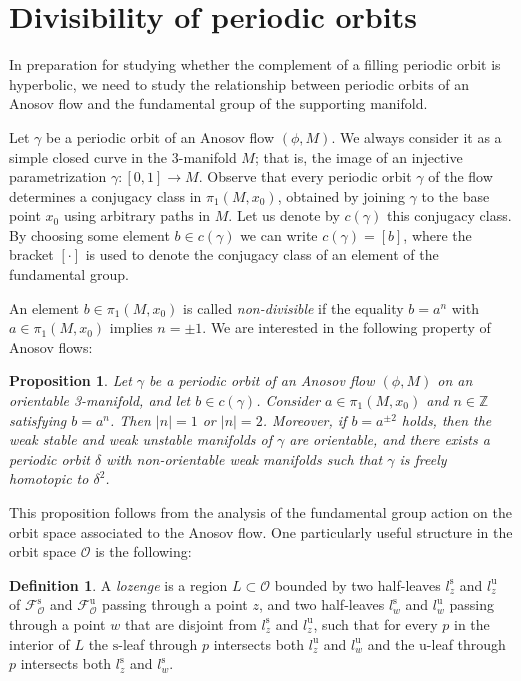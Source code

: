 \documentclass[12pt]{amsart}
\newtheorem{proposition}[theorem]{Proposition}
\theoremstyle{definition}
\newtheorem{definition}[theorem]{Definition}
\theoremstyle{remark}
\renewcommand{\O}{\mathcal{O}}
\newcommand{\Z}{\mathbb{Z}}
\newcommand{\Fs}{\mathcal{F}^{\mathrm{s}}_\mathcal{O}}
\newcommand{\Fu}{\mathcal{F}^{\mathrm{u}}_\mathcal{O}}
\begin{document}
\section{Divisibility of periodic orbits}
\label{sec:divisibility}


In preparation for studying whether the complement of a filling periodic orbit is hyperbolic, we need to study the relationship between periodic orbits of an Anosov flow and the fundamental group of the supporting manifold. 


Let $\gamma$ be a periodic orbit of an Anosov flow $(\phi,M)$. We always consider it as a simple closed curve in the 3-manifold $M$; that is, the image of an injective parametrization $\gamma:[0,1]\to M$. Observe that every periodic orbit $\gamma$ of the flow determines a conjugacy class in $\pi_1(M,x_0)$, obtained by joining $\gamma$ to the base point $x_0$ using arbitrary paths in $M$. Let us denote by $c(\gamma)$ this conjugacy class. By choosing some element $b\in c(\gamma)$ we can write $c(\gamma)=[b]$, where the bracket $[\cdot]$ is used to denote the conjugacy class of an element of the fundamental group. 


An element $b\in\pi_1(M,x_0)$ is called \emph{non-divisible} if the equality $b=a^n$ with $a\in\pi_1(M,x_0)$ implies $n=\pm 1$. We are interested in the following property of Anosov flows:


\begin{proposition}\label{prop_divisibility_per_orbits}
    Let $\gamma$ be a periodic orbit of an Anosov flow $(\phi,M)$ on an orientable 3-manifold, and let $b\in c(\gamma)$. Consider $a\in\pi_1(M,x_0)$ and $n\in\Z$ satisfying $b=a^n$. Then $|n|=1$ or $|n|=2$. Moreover, if $b=a^{\pm 2}$ holds, then the weak stable and weak unstable manifolds of $\gamma$ are orientable, and there exists a periodic orbit $\delta$ with non-orientable weak manifolds such that $\gamma$ is freely homotopic to $\delta^2$.
\end{proposition}


This proposition follows from the analysis of the fundamental group action on the orbit space associated to the Anosov flow. One particularly useful structure in the orbit space $\O$ is the following:


\begin{definition}
A \emph{lozenge} is a region $L\subset\O$ bounded by two half-leaves $l^\mathrm{s}_z$ and $l^\mathrm{u}_z$ of $\Fs$ and $\Fu$ passing through a point $z$, and two half-leaves $l^\mathrm{s}_w$ and $l^\mathrm{u}_w$ passing through a point $w$ that are disjoint from $l^\mathrm{s}_z$ and $l^\mathrm{u}_z$, such that for every $p$ in the interior of $L$ the $\mathrm{s}$-leaf through $p$ intersects both $l^\mathrm{u}_z$ and $l^\mathrm{u}_w$ and the $\mathrm{u}$-leaf through $p$ intersects both $l^\mathrm{s}_z$ and $l^\mathrm{s}_w$. 
\end{definition}
\end{document}
